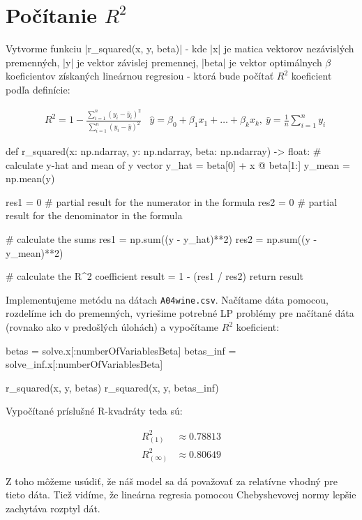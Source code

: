 \documentclass[report.tex]{subfiles}
\begin{document}
   

\section{Počítanie $R^2$}\label{sec:D}
Vytvorme funkciu \pyth|r_squared(x, y, beta)| - kde \pyth|x| je matica vektorov nezávislých premenných, \pyth|y| je vektor závislej premennej, \pyth|beta| je vektor optimálnych $\beta$ koeficientov získaných lineárnou regresiou - ktorá bude počítať $R^2$ koeficient podľa definície:

\begin{align*}
	&R^2 = 1 - \frac{\sum_{i=1}^{n} (y_i - \hat{y}_i)^2}{\sum_{i=1}^{n} (y_i - \bar{y})^2} &\hat{y} = \beta_0 + \beta_1x_1 + \dots + \beta_kx_k,~\bar{y} = \frac{1}{n} \sum_{i=1}^ny_i
\end{align*}

\begin{python}
def r_squared(x: np.ndarray, y: np.ndarray, beta: np.ndarray) -> float:
	# calculate y-hat and mean of y vector
	y_hat = beta[0] + x @ beta[1:]
	y_mean = np.mean(y)
	
	res1 = 0    # partial result for the numerator in the formula
	res2 = 0    # partial result for the denominator in the formula
	
	# calculate the sums
	res1 = np.sum((y - y_hat)**2)
	res2 = np.sum((y - y_mean)**2)
	
	# calculate the R^2 coefficient
	result = 1 - (res1 / res2)
	return result
\end{python}

Implementujeme metódu na dátach \verb|A04wine.csv|. Načítame dáta pomocou, rozdelíme ich do premenných, vyriešime potrebné LP problémy pre načítané dáta (rovnako ako v predošlých úlohách) a vypočítame $R^2$ koeficient:

\begin{python}
	betas = solve.x[:numberOfVariablesBeta]
	betas_inf = solve_inf.x[:numberOfVariablesBeta]
	
	r_squared(x, y, betas)
	r_squared(x, y, betas_inf)
\end{python}
	
Vypočítané príslušné R-kvadráty teda sú:

\begin{align*}
	R^{2}_{(1)} &\approx  0.78813 \\
	R^{2}_{(\infty)} &\approx 0.80649
\end{align*}

Z toho môžeme usúdiť, že náš model sa dá považovať za relatívne vhodný pre tieto dáta. Tiež vidíme, že lineárna regresia pomocou Chebyshevovej normy lepšie zachytáva rozptyl dát.
\end{document}
